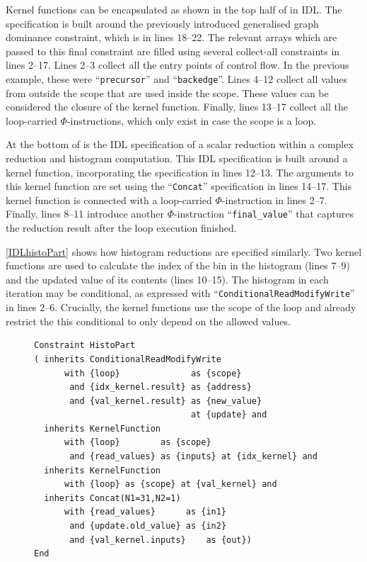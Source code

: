     Kernel functions can be encapsulated as shown in the top half of
     in IDL.
    The specification is built around the previously introduced generalised
    graph dominance constraint, which is in lines 18--22.
    The relevant arrays which are passed to this final constraint are filled
    using several collect-all constraints in lines 2--17.
    Lines 2--3 collect all the entry points of control flow.
    In the previous example, these were ``{\tt precursor}'' and
    ``{\tt backedge}''.
    Lines 4--12 collect all values from outside the scope that are used inside
    the scope.
    These values can be considered the closure of the kernel function.
    Finally, lines 13--17 collect all the loop-carried $\Phi$-instructions,
    which only exist in case the scope is a loop.

    At the bottom of  is the IDL specification of a
    scalar reduction within a complex reduction and histogram computation.
    This IDL specification is built around a kernel function, incorporating the
    specification in lines 12--13.
    The arguments to this kernel function are set using the ``{\tt Concat}''
    specification in lines 14--17.
    This kernel function is connected with a loop-carried $\Phi$-instruction in
    lines 2--7.
    Finally, lines 8--11 introduce another $\Phi$-instruction
    ``{\tt final\_value}'' that captures the reduction result after the loop
    execution finished.

    \autoref{IDLhistoPart} shows how histogram reductions are specified
    similarly.
    Two kernel functions are used to calculate the index of the bin in
    the histogram (lines 7--9) and the updated value of its contents
    (lines 10--15).
    The histogram in each iteration may be conditional, as expressed with
    ``{\tt ConditionalReadModifyWrite}'' in lines 2--6.
    Crucially, the kernel functions use the scope of the loop and already
    restrict the this conditional to only depend on the allowed values.


\begin{figure}[H]
\begin{lstlisting}[language=IDL,label={IDLhistoPart},caption=
   {IDL specification of a histogram reduction within a complex reduction and
    histogram computation:
    Two kernel functions are present: lines 7--9 calculate the index into the
    histogram array, lines 10--11 generate the updated value.
    The read-modify-write step may be conditional.
    \parfillskip=0pt}]
Constraint HistoPart
( inherits ConditionalReadModifyWrite
      with {loop}              as {scope}
       and {idx_kernel.result} as {address}
       and {val_kernel.result} as {new_value}
                               at {update} and
  inherits KernelFunction
      with {loop}        as {scope}
       and {read_values} as {inputs} at {idx_kernel} and
  inherits KernelFunction
      with {loop} as {scope} at {val_kernel} and
  inherits Concat(N1=31,N2=1)
      with {read_values}      as {in1}
       and {update.old_value} as {in2}
       and {val_kernel.inputs}    as {out})
End
\end{lstlisting}
\end{figure}

